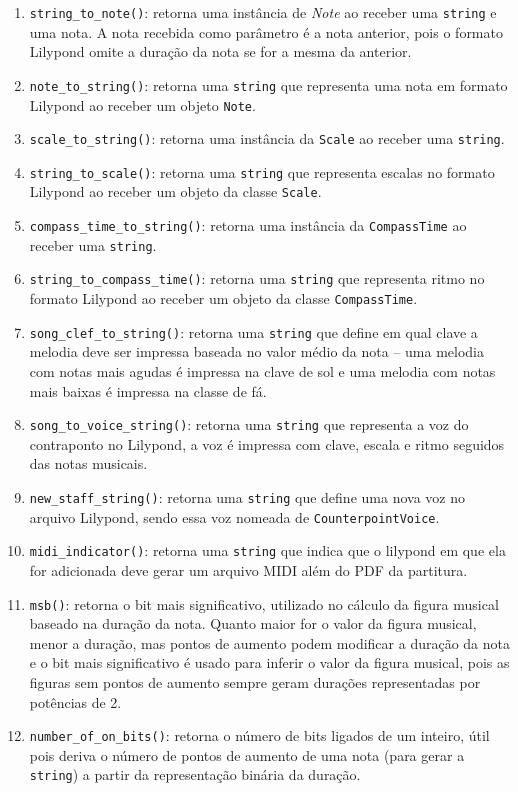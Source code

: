      \begin{enumerate}
        \item \texttt{string\_to\_note()}: retorna uma instância de \textit{Note} ao receber uma \texttt{string} e uma nota. A nota recebida como parâmetro é a nota anterior, pois o formato Lilypond omite a duração da nota se for a mesma da anterior.
        \item \texttt{note\_to\_string()}: retorna uma \texttt{string} que representa uma nota em formato Lilypond ao receber um objeto \texttt{Note}.
        \item \texttt{scale\_to\_string()}: retorna uma instância da \texttt{Scale} ao receber uma \texttt{string}.
        \item \texttt{string\_to\_scale()}: retorna uma \texttt{string} que representa escalas no formato Lilypond ao receber um objeto da classe \texttt{Scale}.
        \item \texttt{compass\_time\_to\_string()}: retorna uma instância da \texttt{CompassTime} ao receber uma \texttt{string}.
        \item \texttt{string\_to\_compass\_time()}: retorna uma \texttt{string} que representa ritmo no formato Lilypond ao receber um objeto da classe \texttt{CompassTime}.
        \item \texttt{song\_clef\_to\_string()}: retorna uma \texttt{string} que define em qual clave a melodia deve ser impressa baseada no valor médio da nota -- uma melodia com notas mais agudas é impressa na clave de sol e uma melodia com notas mais baixas é impressa na classe de fá.
        \item \texttt{song\_to\_voice\_string()}: retorna uma \texttt{string} que representa a voz do contraponto no Lilypond, a voz é impressa com clave, escala e ritmo seguidos das notas musicais.
        \item \texttt{new\_staff\_string()}: retorna uma \texttt{string} que define uma nova voz no arquivo Lilypond, sendo essa voz nomeada de \texttt{CounterpointVoice}.
        \item \texttt{midi\_indicator()}: retorna uma \texttt{string} que indica que o lilypond em que ela for adicionada deve gerar um arquivo MIDI além do PDF da partitura.
        \item \texttt{msb()}: retorna o bit mais significativo, utilizado no cálculo da figura musical baseado na duração da nota. Quanto maior for o valor da figura musical, menor a duração, mas pontos de aumento podem modificar a duração da nota e o bit mais significativo é usado para inferir o valor da figura musical, pois as figuras sem pontos de aumento sempre geram durações representadas por potências de 2.
        \item \texttt{number\_of\_on\_bits()}: retorna o número de bits ligados de um inteiro, útil pois deriva o número de pontos de aumento de uma nota (para gerar a \texttt{string}) a partir da representação binária da duração.
      \end{enumerate}

